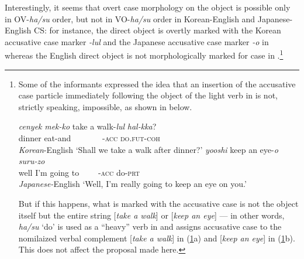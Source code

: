 \largerpage[-1]
Interestingly, it seems that overt case morphology on the object is possible only in \ac{OV}-\textit{ha/su} order, but not in \ac{VO}-\textit{ha/su} order in Korean-English and Japanese-English \ac{CS}: for instance, the direct object is overtly marked with the Korean accusative case marker \textit{{}-lul} and the Japanese accusative case marker \textit{{}-o} in  whereas the English direct object is not morphologically marked for case in .\footnote{Some of the informants expressed the idea that an insertion of the accusative case particle immediately following the object of the light verb in  is not, strictly speaking, impossible, as shown in  below. 
\begin{exe}\ex\label{exfn78:i}
\begin{xlist}
    \ex \gll \textit{cenyek} \textit{mek-ko} take a walk-\textit{lul}   \textit{hal-kka}?   \\
    dinner eat-and {} {} {~~~~~~~}-\textsc{acc} \textsc{do}\textsc{.fut-coh} \\
    \hspace*{\fill} \textit{Korean}-English  
    \glt ‘Shall we take a walk after dinner?’
    \ex \gll \textit{yooshi}         keep an eye-\textit{o}    \textit{suru-zo} \\
    {well I’m going to} {} {} {~~~~}-\textsc{acc}  do-\textsc{prt}    \\
    \hspace*{\fill} \textit{Japanese-}English 
    \glt  ‘Well, I’m really going to keep an eye on you.’
\end{xlist}
\end{exe}
But if this happens, what is marked with the accusative case is not the object itself but the entire string [\textit{take a walk}] or [\textit{keep an eye}] — in other words, \textit{ha/su} `do' is used as a ``heavy'' verb in  and assigns accusative case to the nomilaized verbal complement [\textit{take a walk}] in (\ref{exfn78:i}a) and [\textit{keep an eye}] in (\ref{exfn78:i}b). This does not affect the proposal made here.}

